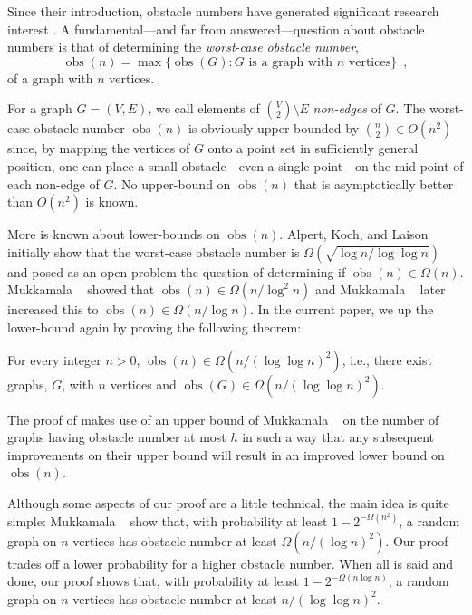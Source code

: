 \documentclass{patmorin}
\DeclareMathOperator{\obs}{obs}
\begin{document}
Since their introduction, obstacle numbers have generated significant
research interest 
\cite{%
   fulek.saeedi:convex,%
   johnson.sarioz:computing,%
   mukkamala.pach.ea:lower,%
   mukkamala.pach.ea:graphs,%
   pach.sarioz:small,%
   pach.sarioz:on,%
   sarioz:approximating%
}.
A fundamental---and far from answered---question about obstacle numbers
is that of determining the \emph{worst-case obstacle number},
\[
    \obs(n) = \max \{\obs(G) :\mbox{$G$ is a graph with $n$ vertices}\}
    \enspace ,
\] 
of a graph with $n$ vertices.

For a graph $G=(V,E)$, we call elements of $\binom{V}{2}\setminus E$
\emph{non-edges} of $G$.  The worst-case obstacle number $\obs(n)$ is
obviously upper-bounded by $\binom{n}{2}\in O(n^2)$ since, by mapping
the vertices of $G$ onto a point set in sufficiently general position,
one can place a small obstacle---even a single point---on the mid-point
of each non-edge of $G$.  No upper-bound on $\obs(n)$ that is asymptotically
better than $O(n^2)$ is known.

More is known about lower-bounds on $\obs(n)$.  Alpert, Koch, and Laison \cite{alpert.koch.ea:obstacle}
initially show that the worst-case obstacle number is
$\Omega\left(\sqrt{\log n/\log\log n}\right)$ and posed as an open problem the question
of determining if $\obs(n)\in\Omega(n)$.
Mukkamala \etal\ \cite{mukkamala.pach.ea:graphs} showed that $\obs(n)\in
\Omega(n/\log^2 n)$ and Mukkamala \etal\ \cite{mukkamala.pach.ea:lower}
later increased this to $\obs(n)\in\Omega(n/\log n)$.  In the current paper,
we up the lower-bound again by proving the following theorem:
\begin{thm}
  For every integer $n>0$, $\obs(n)\in\Omega(n/(\log\log n)^2)$, i.e., there
  exist graphs, $G$, with $n$ vertices and $\obs(G)\in\Omega(n/(\log\log
  n)^2)$.
\end{thm}

The proof of  makes use of an upper bound of Mukkamala \etal\
\cite[Theorem~1]{mukkamala.pach.ea:lower} on the number of graphs having
obstacle number at most $h$ in such a way that any subsequent improvements
on their upper bound will result in an improved lower bound on $\obs(n)$.

Although some aspects of our proof are a little technical, the main
idea is quite simple:  Mukkamala \etal\ \cite{mukkamala.pach.ea:lower}
show that, with probability at least $1-2^{-\Omega(n^2)}$, a random
graph on $n$ vertices has obstacle number at least $\Omega(n/(\log n)^2)$.
Our proof trades off a lower probability for a higher obstacle number.
When all is said and done, our proof shows that, with probability at least
$1-2^{-\Omega(n\log n)}$, a random graph on $n$ vertices has obstacle
number at least $n/(\log\log n)^2$.
\end{document}
